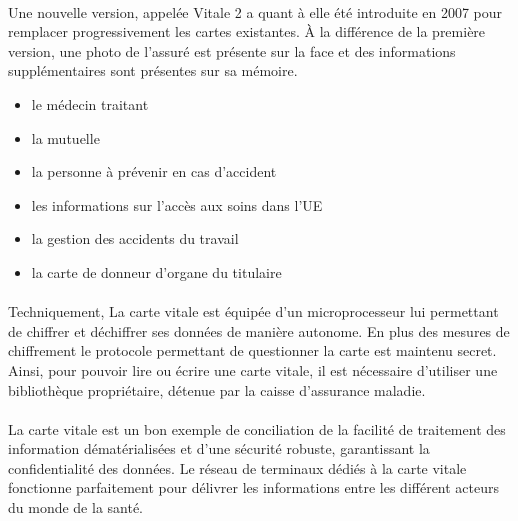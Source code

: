 \paragraph{}
Une nouvelle version, appelée Vitale 2 a quant à elle été introduite en
2007 pour remplacer progressivement les cartes existantes.  À la différence
de la première version, une photo de l'assuré est présente sur la face et
des informations supplémentaires sont présentes sur sa mémoire.

\begin{itemize}
    \item le médecin traitant
    \item la mutuelle
    \item la personne à prévenir en cas d'accident
    \item les informations sur l'accès aux soins dans l'UE
    \item la gestion des accidents du travail
    \item la carte de donneur d'organe du titulaire
\end{itemize}

\paragraph{}
Techniquement, La carte vitale est équipée d'un microprocesseur lui
permettant de chiffrer et déchiffrer ses données de manière autonome. En
plus des mesures de chiffrement le protocole permettant de questionner la
carte est maintenu secret. Ainsi, pour pouvoir lire ou écrire une carte
vitale, il est nécessaire d'utiliser une bibliothèque propriétaire, détenue
par la caisse d'assurance maladie.

\paragraph{}
La carte vitale est un bon exemple de conciliation de la facilité de traitement
des information dématérialisées et d'une sécurité robuste, garantissant la
confidentialité des données. Le réseau de terminaux dédiés à la carte vitale
fonctionne parfaitement pour délivrer les informations entre les différent
acteurs du monde de la santé.
